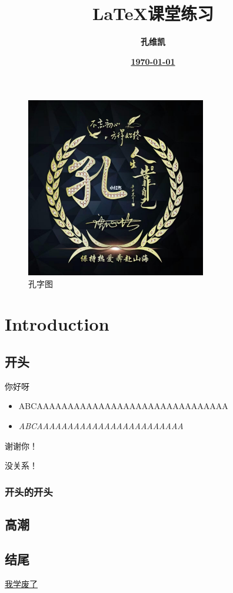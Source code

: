 \documentclass{ctexart}
\title{\textbf{LaTeX课堂练习}}
\author{\textbf{孔维凯}}
\date{\underline{\textbf{\today}}}
\begin{document}
\maketitle

\newpage
\tableofcontents
\begin{figure}[h]
    \centering
    \includegraphics[width=0.7\textwidth]{815904a17fdc5c4a7e41c3dc798ebccd.jpeg}
    \caption{孔字图}
\end{figure}
\newpage

\section{Introduction}
\subsection{开头}
你好呀
\begin{itemize}
    \item ABCAAAAAAAAAAAAAAAAAAAAAAAAAAAAAAA
    \item \textit{ABCAAAAAAAAAAAAAAAAAAAAAAAA}
\end{itemize}

\begin{center}
    谢谢你！
\end{center}
没关系！
\subsubsection{开头的开头}
\lipsum[1-3]
\subsection{高潮}
\textbf{\lipsum[1-3]}
\subsection{结尾}
\underline{我学废了}
\end{document}
